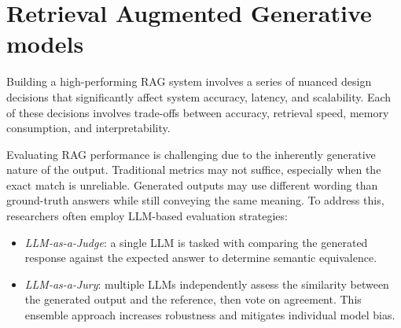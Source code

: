 \section{Retrieval Augmented Generative models}

Building a high-performing RAG system involves a series of nuanced design decisions that significantly affect system accuracy, latency, and scalability.
Each of these decisions involves trade-offs between accuracy, retrieval speed, memory consumption, and interpretability.

Evaluating RAG performance is challenging due to the inherently generative nature of the output. 
Traditional metrics may not suffice, especially when the exact match is unreliable. 
Generated outputs may use different wording than ground-truth answers while still conveying the same meaning. 
To address this, researchers often employ LLM-based evaluation strategies:
\begin{itemize}
    \item \textit{LLM-as-a-Judge}: a single LLM is tasked with comparing the generated response against the expected answer to determine semantic equivalence.
    \item \textit{LLM-as-a-Jury}: multiple LLMs independently assess the similarity between the generated output and the reference, then vote on agreement. This ensemble approach increases robustness and mitigates individual model bias.
\end{itemize}